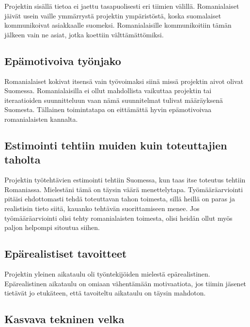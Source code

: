 \documentclass[a4paper]{article}
\begin{document}
Projektin sisällä tietoa ei jaettu tasapuolisesti eri tiimien välillä. Romanialaiset jäivät usein vaille ymmärrystä projektin ympäristöstä, koska suomalaiset kommunikoivat asiakkaalle suomeksi. Romanialaisille kommunikoitiin tämän jälkeen vain ne asiat, jotka koettiin välttämättömiksi.

\subsection{Epämotivoiva työnjako}

Romanialaiset kokivat itsensä vain työvoimaksi siinä missä projektin aivot olivat Suomessa. Romanialaisilla ei ollut mahdollista vaikuttaa projektin tai iteraatioiden suunnitteluun vaan nämä suunnitelmat tulivat määräyksenä Suomesta. Tällainen toimintatapa on eittämättä hyvin epämotivoivaa romanialaisten kannalta.

\subsection{Estimointi tehtiin muiden kuin toteuttajien taholta}

Projektin työtehtävien estimointi tehtiin Suomessa, kun taas itse toteutus tehtiin Romaniassa. Mielestäni tämä on täysin väärä menettelytapa. Työmääräarviointi pitäisi ehdottomasti tehdä toteuttavan tahon toimesta, sillä heillä on paras ja realistisin tieto siitä, kauanko tehtävän suorittamiseen menee. Jos työmääräarviointi olisi tehty romanialaisten toimesta, olisi heidän ollut myös paljon helpompi sitoutua siihen.

\subsection{Epärealistiset tavoitteet}

Projektin yleinen aikataulu oli työntekijöiden mielestä epärealistinen. Epärealistinen aikataulu on omiaan vähentämään motivaatiota, jos tiimin jäsenet tietävät jo etukäteen, että tavoiteltu aikataulu on täysin mahdoton.

\subsection{Kasvava tekninen velka}
\end{document}
